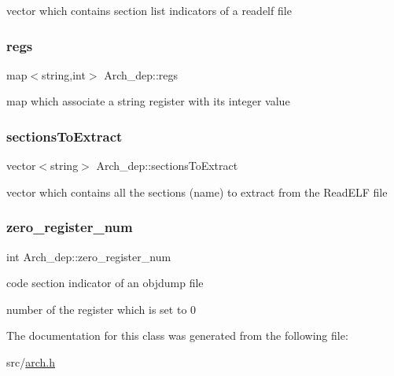 vector which contains section list indicators of a readelf file \mbox{\label{classArch__dep_adca30c5e86132ee9d152638d6db513bb}} 
\subsubsection{\texorpdfstring{regs}{regs}}
{\footnotesize\ttfamily map$<$string,int$>$ Arch\+\_\+dep\+::regs\hspace{0.3cm}{\ttfamily [protected]}}

map which associate a string register with its integer value \mbox{\label{classArch__dep_aa92e4e668b37f15cabfca78f2ee4406a}} 
\subsubsection{\texorpdfstring{sections\+To\+Extract}{sectionsToExtract}}
{\footnotesize\ttfamily vector$<$string$>$ Arch\+\_\+dep\+::sections\+To\+Extract\hspace{0.3cm}{\ttfamily [protected]}}

vector which contains all the sections (name) to extract from the Read\+E\+LF file \mbox{\label{classArch__dep_aef2b07cdb458eeabf49511678238d91c}} 
\subsubsection{\texorpdfstring{zero\+\_\+register\+\_\+num}{zero\_register\_num}}
{\footnotesize\ttfamily int Arch\+\_\+dep\+::zero\+\_\+register\+\_\+num\hspace{0.3cm}{\ttfamily [protected]}}

code section indicator of an objdump file

number of the register which is set to 0 

The documentation for this class was generated from the following file\+:\begin{DoxyCompactItemize}
\item 
src/\hyperlink{arch_8h}{arch.\+h}\end{DoxyCompactItemize}
